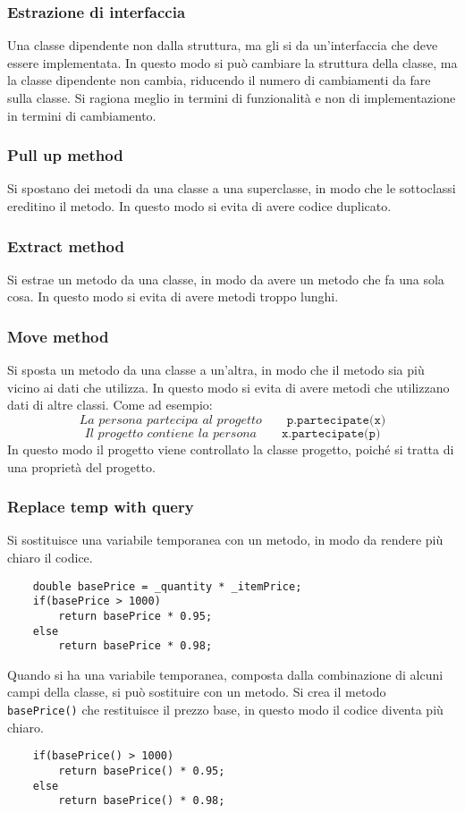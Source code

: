 \subsubsection{Estrazione di interfaccia}
Una classe dipendente non dalla struttura, ma gli si da un'interfaccia
che deve essere implementata. In questo modo si può cambiare la struttura
della classe, ma la classe dipendente non cambia, riducendo il numero di 
cambiamenti da fare sulla classe. Si ragiona meglio in termini di funzionalità 
e non di implementazione in termini di cambiamento.
\subsubsection{Pull up method}
Si spostano dei metodi da una classe a una superclasse, in modo che
le sottoclassi ereditino il metodo. In questo modo si evita di avere
codice duplicato. 
\subsubsection{Extract method}
Si estrae un metodo da una classe, in modo da avere un metodo che
fa una sola cosa. In questo modo si evita di avere metodi troppo lunghi.
\subsubsection{Move method}
Si sposta un metodo da una classe a un'altra, in modo che il metodo
sia più vicino ai dati che utilizza. In questo modo si evita di avere
metodi che utilizzano dati di altre classi.
Come ad esempio:
\[
    \textit{La persona partecipa al progetto}\qquad \texttt{p.partecipate(x)}
\]
\[
    \textit{Il progetto contiene la persona} \qquad \texttt{x.partecipate(p)}
\]
In questo modo il progetto viene controllato la classe progetto,
poiché si tratta di una proprietà del progetto.
\subsubsection{Replace temp with query}
Si sostituisce una variabile temporanea con un metodo, in modo da
rendere più chiaro il codice.
\begin{lstlisting}
    double basePrice = _quantity * _itemPrice;
    if(basePrice > 1000)
        return basePrice * 0.95;
    else
        return basePrice * 0.98;
\end{lstlisting}
Quando si ha una variabile temporanea, composta dalla combinazione 
di alcuni campi della classe, si può sostituire con un metodo.
Si crea il metodo \texttt{basePrice()} che restituisce il
prezzo base, in questo modo il codice diventa più chiaro.
\begin{lstlisting}
    if(basePrice() > 1000)
        return basePrice() * 0.95;
    else
        return basePrice() * 0.98;
\end{lstlisting}
